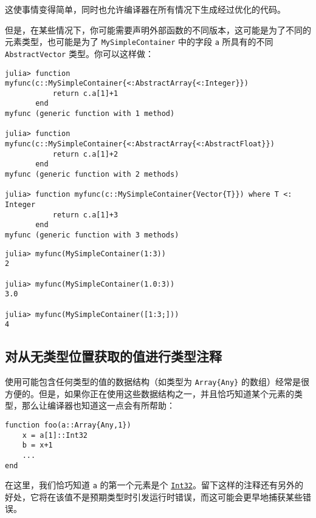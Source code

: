 这使事情变得简单，同时也允许编译器在所有情况下生成经过优化的代码。



但是，在某些情况下，你可能需要声明外部函数的不同版本，这可能是为了不同的元素类型，也可能是为了 \texttt{MySimpleContainer} 中的字段 \texttt{a} 所具有的不同 \texttt{AbstractVector} 类型。你可以这样做：




\begin{verbatim}
julia> function myfunc(c::MySimpleContainer{<:AbstractArray{<:Integer}})
           return c.a[1]+1
       end
myfunc (generic function with 1 method)

julia> function myfunc(c::MySimpleContainer{<:AbstractArray{<:AbstractFloat}})
           return c.a[1]+2
       end
myfunc (generic function with 2 methods)

julia> function myfunc(c::MySimpleContainer{Vector{T}}) where T <: Integer
           return c.a[1]+3
       end
myfunc (generic function with 3 methods)
\end{verbatim}




\begin{verbatim}
julia> myfunc(MySimpleContainer(1:3))
2

julia> myfunc(MySimpleContainer(1.0:3))
3.0

julia> myfunc(MySimpleContainer([1:3;]))
4
\end{verbatim}



\hypertarget{18349216047452588444}{}


\subsection{对从无类型位置获取的值进行类型注释}



使用可能包含任何类型的值的数据结构（如类型为 \texttt{Array\{Any\}} 的数组）经常是很方便的。但是，如果你正在使用这些数据结构之一，并且恰巧知道某个元素的类型，那么让编译器也知道这一点会有所帮助：




\begin{verbatim}
function foo(a::Array{Any,1})
    x = a[1]::Int32
    b = x+1
    ...
end
\end{verbatim}



在这里，我们恰巧知道 \texttt{a} 的第一个元素是个 \hyperlink{10103694114785108551}{\texttt{Int32}}。留下这样的注释还有另外的好处，它将在该值不是预期类型时引发运行时错误，而这可能会更早地捕获某些错误。



